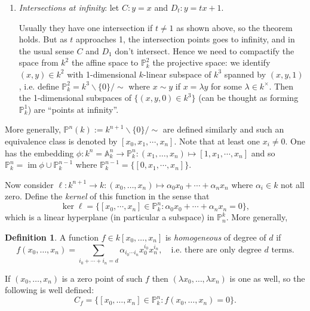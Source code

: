 \documentclass{article}
\newcommand{\p}{\mathbb{P}}
\newcommand{\A}{\mathbb{A}}
\newcommand{\im}{\operatorname{im}}
\theoremstyle{definition}
\newtheorem{defn}{Definition}[subsection]
\begin{document}
\begin{enumerate}
\item \textit{Intersections at infinity}: let $C:y=x$ and $D_t:y=tx+1$.

\begin{center}
\end{center}

Usually they have one intersection if $t\neq 1$ as shown above, so the theorem holds. But as $t$ approaches 1, the intersection points goes to infinity, and in the usual sense $C$ and $D_1$ don't intersect. Hence we need to compactify the space from $k^2$ the affine space to $\p^2_k$ the projective space: we identify $(x,y)\in k^2$ with 1-dimensional $k$-linear subspace of $k^3$ spanned by $(x,y,1)$, i.e. define $\p^2_k=k^3\backslash\{0\}/\sim$ where $x\sim y$ if $x=\lambda y$ for some $\lambda\in k^\times$. Then the 1-dimensional subspaces of $\{(x,y,0)\in k^3\}$ (can be thought as forming $\p^1_k$) are ``points at infinity''.
\end{enumerate}

More generally, $\p^n(k):=k^{n+1}\backslash\{0\}/\sim$ are defined similarly and such an equivalence class is denoted by $[x_0,x_1,\cdots,x_n]$. Note that at least one $x_i\neq 0$. One has the embedding $\phi:k^n=\A_k^n\rightarrow\p_k^n:(x_1,\ldots,x_n)\mapsto [1,x_1,\cdots,x_n]$ and so $\p_k^n=\im\phi\cup\p_k^{n-1}$ where $\p_k^{n-1}=\{[0,x_1,\cdots,x_{n }]\}$.

Now consider $\ell:k^{n+1}\rightarrow k:(x_0,\ldots,x_n)\mapsto\alpha_0x_0+\cdots+\alpha_nx_n$ where $\alpha_i\in k$ not all zero. Define the \textit{kernel} of this function in the sense that
\[
\ker\ell=\{[x_0,\cdots,x_n]\in\p_k^n:\alpha_0x_0+\cdots+\alpha_nx_n=0\},
\]
which is a linear hyperplane (in particular a subspace) in $\p_n^k$. More generally,
\begin{defn}
A function $f\in k[x_0,\ldots,x_n]$ is \textit{homogeneous} of degree of $d$ if
\[
f(x_0,\ldots,x_n)=\sum_{i_0+\cdots+i_n=d}\alpha_{i_0\cdots i_n}x_0^{i_0}x_n^{i_n},\quad\text{i.e. there are only degree }d\text{ terms}.
\]
\end{defn}
If $(x_0,\ldots,x_n)$ is a zero point of such $f$ then $(\lambda x_0,\ldots,\lambda x_n)$ is one as well, so the following is well defined:
\[
C_f=\{[x_0,\ldots,x_n]\in\p_k^n:f(x_0,\ldots,x_n)=0\}.
\]
\end{document}
